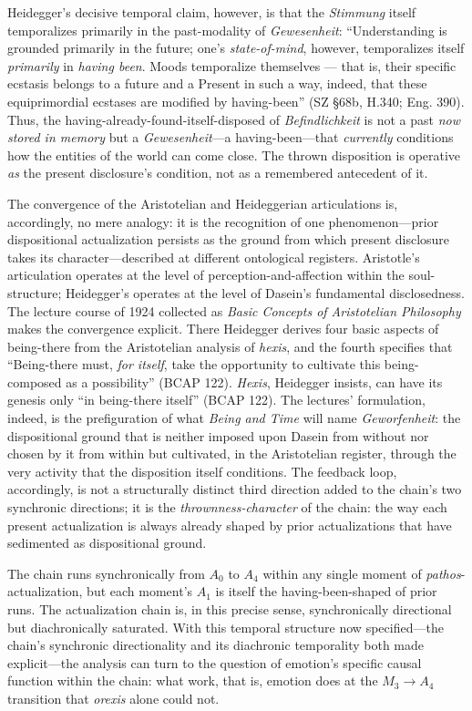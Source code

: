 \documentclass{article}
\begin{document}
Heidegger's decisive temporal claim, however, is that the \textit{Stimmung} itself temporalizes primarily in the past-modality of \textit{Gewesenheit}: ``Understanding is grounded primarily in the future; one's \textit{state-of-mind}, however, temporalizes itself \textit{primarily} in \textit{having been}. Moods temporalize themselves --- that is, their specific ecstasis belongs to a future and a Present in such a way, indeed, that these equiprimordial ecstases are modified by having-been'' (SZ \S68b, H.340; Eng. 390). Thus, the having-already-found-itself-disposed of \textit{Befindlichkeit} is not a past \textit{now stored in memory} but a \textit{Gewesenheit}---a having-been---that \textit{currently} conditions how the entities of the world can come close. The thrown disposition is operative \textit{as} the present disclosure's condition, not as a remembered antecedent of it.

The convergence of the Aristotelian and Heideggerian articulations is, accordingly, no mere analogy: it is the recognition of one phenomenon---prior dispositional actualization persists as the ground from which present disclosure takes its character---described at different ontological registers. Aristotle's articulation operates at the level of perception-and-affection within the soul-structure; Heidegger's operates at the level of Dasein's fundamental disclosedness. The lecture course of 1924 collected as \textit{Basic Concepts of Aristotelian Philosophy} makes the convergence explicit. There Heidegger derives four basic aspects of being-there from the Aristotelian analysis of \textit{hexis}, and the fourth specifies that ``Being-there must, \textit{for itself}, take the opportunity to cultivate this being-composed as a possibility'' (BCAP 122). \textit{Hexis}, Heidegger insists, can have its genesis only ``in being-there itself'' (BCAP 122). The lectures' formulation, indeed, is the prefiguration of what \textit{Being and Time} will name \textit{Geworfenheit}: the dispositional ground that is neither imposed upon Dasein from without nor chosen by it from within but cultivated, in the Aristotelian register, through the very activity that the disposition itself conditions. The feedback loop, accordingly, is not a structurally distinct third direction added to the chain's two synchronic directions; it is the \textit{thrownness-character} of the chain: the way each present actualization is always already shaped by prior actualizations that have sedimented as dispositional ground.

The chain runs synchronically from $A_0$ to $A_4$ within any single moment of \textit{pathos}-actualization, but each moment's $A_1$ is itself the having-been-shaped of prior runs. The actualization chain is, in this precise sense, synchronically directional but diachronically saturated. With this temporal structure now specified---the chain's synchronic directionality and its diachronic temporality both made explicit---the analysis can turn to the question of emotion's specific causal function within the chain: what work, that is, emotion does at the $M_3 \rightarrow A_4$ transition that \textit{orexis} alone could not.
\end{document}
